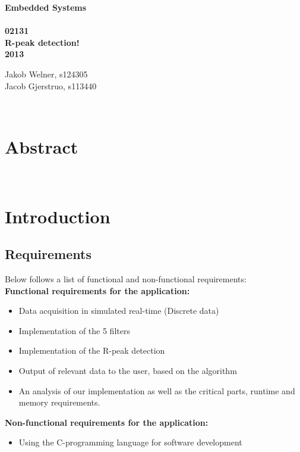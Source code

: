 \documentclass[12pt,a4paper]{article}
\begin{document}
\begin{titlepage}
	\begin{center}
		\vspace*{13\baselineskip}
		\huge
		\bfseries
		Embedded Systems\\ 
		\ \\
		02131 \\[5\baselineskip]

		\normalfont
		\Large
		R-peak detection!\\	
		2013

		\small
		\vfill
	\end{center}	
	\begin{flushleft}
		Jakob Welner, s124305\\
	 	Jacob Gjerstruo, s113440\\
	\end{flushleft}
\end{titlepage}

\ \\
\section*{Abstract}


\thispagestyle{empty} 
\newpage

\tableofcontents
\thispagestyle{empty} 
\newpage

\setcounter{page}{1}

\ \\
\section{Introduction}
	
\subsection{Requirements}
Below follows a list of functional and non-functional requirements:\\

\textbf{ Functional requirements for the application:}
\begin{itemize}
	\item Data acquisition in simulated real-time (Discrete data)
	\item Implementation of the 5 filters
	\item Implementation of the R-peak detection
	\item Output of relevant data to the user, based on the algorithm
	\item An analysis of our implementation as well as the critical parts, runtime and memory requirements.
\end{itemize}
\textbf{Non-functional requirements for the application:}
\begin {itemize}
	\item Using the C-programming language for software development
\end{itemize}
\end{document}
